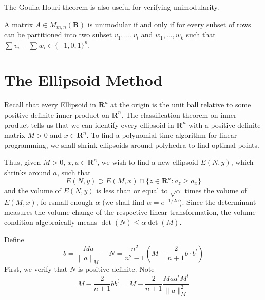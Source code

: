 The Gouila-Houri theorem is also useful for verifying unimodularity.

\begin{theorem}
    A matrix $A \in M_{m,n}(\mathbf{R})$ is unimodular if and only if for every subset of rows can be partitioned into two subset $v_1, \dots, v_l$ and $w_1, \dots, w_k$ such that $\sum v_i - \sum w_i \in \{ -1, 0, 1 \}^n$.
\end{theorem}

\chapter{The Ellipsoid Method}

Recall that every Ellipsoid in $\mathbf{R}^n$ at the origin is the unit ball relative to some positive definite inner product on $\mathbf{R}^n$. The classification theorem on inner product tells us that we can identify every ellipsoid in $\mathbf{R}^n$ with a positive definite matrix $M > 0$ and $x \in \mathbf{R}^n$. To find a polynomial time algorithm for linear programming, we shall shrink ellipsoids around polyhedra to find optimal points.

Thus, given $M > 0$, $x, a \in \mathbf{R}^n$, we wish to find a new ellipsoid $E(N,y)$, which shrinks around $a$, such that
%
\[ E(N, y) \supset E(M,x) \cap \{ z \in \mathbf{R}^n : a_z \geq a_x \} \]
%
and the volume of $E(N, y)$ is less than or equal to $\sqrt{\alpha}$ times the volume of $E(M,x)$, fo rsmall enough $\alpha$ (we shall find $\alpha = e^{-1/2n}$). Since the determinant measures the volume change of the respective linear transformation, the volume condition algebraically means $\det(N) \leq \alpha \det(M)$.

Define
%
\[ b = \frac{Ma}{\|a\|_M}\ \ \ \ \ N = \frac{n^2}{n^2 - 1} (M - \frac{2}{n+1} b \cdot b^t) \]
%
First, we verify that $N$ is positive definite. Note
%
\[ M - \frac{2}{n+1} bb^t = M - \frac{2}{n+1} \frac{Maa^tM^t}{\|a\|_M^2} \]

